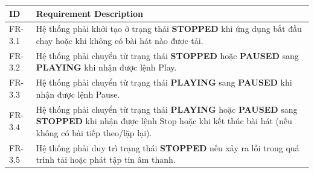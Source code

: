 \documentclass{article}
\begin{document}
\begin{center}
\renewcommand{\arraystretch}{1.5}
\begin{tabular}{|l|p{12cm}|}
\hline
\textbf{ID} & \textbf{Requirement Description} \\ \hline
FR-3.1 & Hệ thống phải khởi tạo ở trạng thái \textbf{STOPPED} khi ứng dụng bắt đầu chạy hoặc khi không có bài hát nào được tải. \\ \hline
FR-3.2 & Hệ thống phải chuyển từ trạng thái \textbf{STOPPED} hoặc \textbf{PAUSED} sang \textbf{PLAYING} khi nhận được lệnh Play. \\ \hline
FR-3.3 & Hệ thống phải chuyển từ trạng thái \textbf{PLAYING} sang \textbf{PAUSED} khi nhận được lệnh Pause. \\ \hline
FR-3.4 & Hệ thống phải chuyển từ trạng thái \textbf{PLAYING} hoặc \textbf{PAUSED} sang \textbf{STOPPED} khi nhận được lệnh Stop hoặc khi kết thúc bài hát (nếu không có bài tiếp theo/lặp lại). \\ \hline
FR-3.5 & Hệ thống phải duy trì trạng thái \textbf{STOPPED} nếu xảy ra lỗi trong quá trình tải hoặc phát tập tin âm thanh. \\ \hline
\end{tabular}
\end{center}
\end{document}
